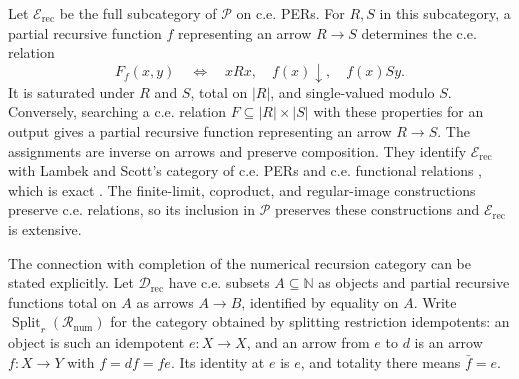\documentclass[11pt]{article}
\theoremstyle{definition}
\theoremstyle{remark}
\begin{document}
Let $\mathcal E_{\mathrm{rec}}$ be the full subcategory of $\mathcal P$
on c.e. PERs. For $R,S$ in this subcategory, a partial recursive function $f$
representing an arrow $R\to S$ determines the c.e. relation
\[
 F_f(x,y)\quad\Longleftrightarrow\quad
 xRx,\quad f(x)\downarrow,\quad f(x)S y.
\]
It is saturated under $R$ and $S$, total on $|R|$, and single-valued
modulo $S$. Conversely, searching a c.e. relation
$F\subseteq |R|\times |S|$ with these properties for an output
gives a partial recursive function representing an arrow $R\to S$.
The assignments are inverse on arrows and preserve composition.
They identify $\mathcal E_{\mathrm{rec}}$ with Lambek and Scott's
category of c.e. PERs and c.e. functional relations
\cite[Definition~2.4 and Remark~2.6]{LambekScott}, which is exact
\cite[Theorem~4.5]{LambekScott}.
The finite-limit, coproduct, and regular-image constructions preserve
c.e. relations, so its inclusion in $\mathcal P$ preserves these
constructions and $\mathcal E_{\mathrm{rec}}$ is extensive.

The connection with completion of the numerical recursion category
can be stated explicitly. Let $\mathcal D_{\mathrm{rec}}$ have c.e.
subsets $A\subseteq\mathbb N$ as objects and partial recursive
functions total on $A$ as arrows $A\to B$, identified by equality
on $A$. Write $\operatorname{Split}_r(\mathcal R_{\mathrm{num}})$
for the category obtained by splitting restriction idempotents:
an object is such an idempotent $e:X\to X$, and an arrow from $e$
to $d$ is an arrow $f:X\to Y$ with $f=df=fe$.
Its identity at $e$ is $e$, and totality there means $\bar f=e$.
\end{document}
